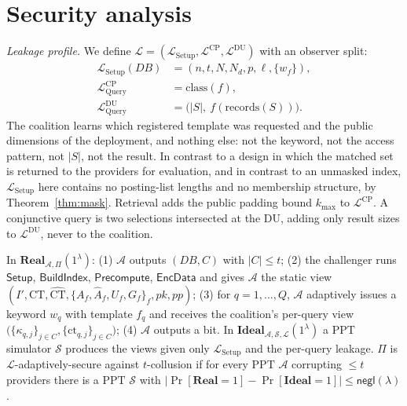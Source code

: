\documentclass[a4paper,fleqn]{cas-dc}
\newcommand{\negl}{\mathsf{negl}}
\newcommand{\PPT}{\mathrm{PPT}}
\newcommand{\Real}{\mathbf{Real}}
\newcommand{\Ideal}{\mathbf{Ideal}}
\newcommand{\Leak}{\mathcal{L}}
\newcommand{\Sim}{\mathcal{S}}
\newcommand{\Adv}{\mathcal{A}}
\begin{document}
\section{Security analysis}
\label{sec:security}

\emph{Leakage profile.} We define
$\Leak=(\Leak_{\mathrm{Setup}},\Leak^{\text{CP}},\Leak^{\text{DU}})$ with an
observer split:
\begin{align*}
\Leak_{\mathrm{Setup}}(DB) &= (n,t,N,N_d,p,\ell,\{w_f\}),\\
\Leak^{\text{CP}}_{\mathrm{Query}} &= \mathrm{class}(f),\\
\Leak^{\text{DU}}_{\mathrm{Query}} &= \big(|S|,\ f(\mathrm{records}(S))\big).
\end{align*}
The coalition learns which registered template was requested and the public
dimensions of the deployment, and nothing else: not the keyword, not the
access pattern, not $|S|$, not the result. In contrast to a design in which
the matched set is returned to the providers for evaluation, and in contrast
to an unmasked index, $\Leak_{\mathrm{Setup}}$ here contains no posting-list
lengths and no membership structure, by Theorem~\ref{thm:mask}. Retrieval adds
the public padding bound $k_{\max}$ to $\Leak^{\text{CP}}$. A conjunctive
query is two selections intersected at the DU, adding only result sizes to
$\Leak^{\text{DU}}$, never to the coalition.

\begin{definition}[$\Leak$-security against $t$-collusion]
\label{def:sec}
In $\Real_{\Adv,\Pi}(1^\lambda)$: (1) $\Adv$ outputs $(DB,C)$ with $|C|\le t$;
(2) the challenger runs $\mathsf{Setup}$, $\mathsf{BuildIndex}$,
$\mathsf{Precompute}$, $\mathsf{EncData}$ and gives $\Adv$ the static view
$(I',\text{CT},\widehat{\text{CT}},\{A_f,\widehat A_f,U_f,G_f\}_f,pk,pp)$;
(3) for $q=1,\dots,Q$, $\Adv$ adaptively issues a keyword $w_q$ with template
$f_q$ and receives the coalition's per-query view
$\big(\{\kappa_{q,j}\}_{j\in C},\{\text{ct}_{q,j}\}_{j\in C}\big)$; (4) $\Adv$
outputs a bit. In $\Ideal_{\Adv,\Sim,\Leak}(1^\lambda)$ a $\PPT$ simulator
$\Sim$ produces the views given only $\Leak_{\mathrm{Setup}}$ and the
per-query leakage. $\Pi$ is $\Leak$-adaptively-secure against $t$-collusion if
for every $\PPT$ $\Adv$ corrupting $\le t$ providers there is a $\PPT$ $\Sim$
with $|\Pr[\Real=1]-\Pr[\Ideal=1]|\le\negl(\lambda)$.
\end{definition}
\end{document}
